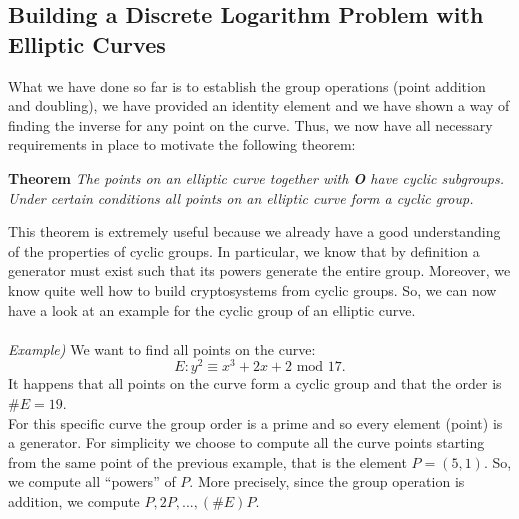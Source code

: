 \documentclass[11pt, a4paper]{article}
\newcommand{\doublequotes}[1]{“#1”}
\newcommand{\mymod}{
    \text{ mod }
}
\begin{document}
\subsection{Building a Discrete Logarithm Problem with Elliptic Curves}
What we have done so far is to establish the group operations (point addition and doubling), we have provided an identity element and we have shown a way of finding the inverse for any point on the curve. Thus, we now have all necessary requirements in place to motivate the following theorem:
\begin{framed}
    \hfill\break\textbf{Theorem} \textit{The points on an elliptic curve together with \textbf{O} have cyclic subgroups. Under certain conditions all points on an elliptic curve form a cyclic group.}
\end{framed}
This theorem is extremely useful because we already have a good understanding of the properties of cyclic groups. In particular, we know that by definition a generator must exist such that its powers generate the entire group. Moreover, we know quite well how to build cryptosystems from cyclic groups. So, we can now have a look at an example for the cyclic group of an elliptic curve.\\\\
\textit{Example)} We want to find all points on the curve:$$E:y^2\equiv x^3+2x+2\mymod17.$$
It happens that all points on the curve form a cyclic group and that the order is $\#E=19$.\\
For this specific curve the group order is a prime and so every element (point) is a generator. For simplicity we choose to compute all the curve points starting from the same point of the previous example, that is the element $P=(5,1)$. So, we compute all \doublequotes{powers} of $P$. More precisely, since the group operation is addition, we compute $P,2P,...,(\#E)P$.
\end{document}
